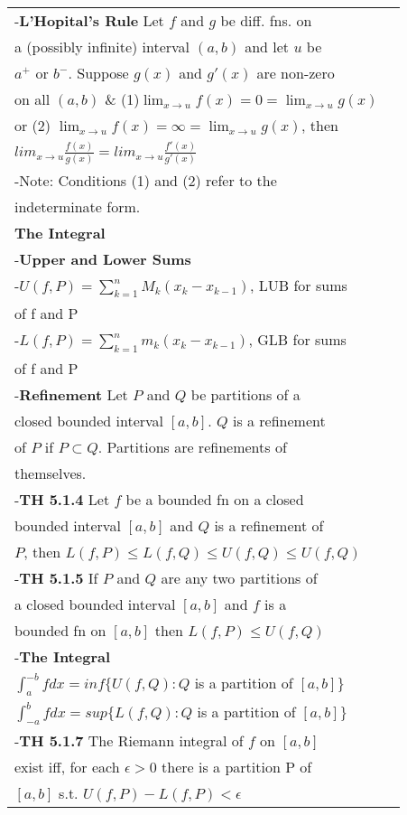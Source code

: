 \documentclass[10 pt,landscape]{article}
\begin{document}
\begin{multicols}{4}
\begin{tabular}{@{}ll@{}}
\end{tabular} 

\begin{tabular}{@{}ll@{}}


-\textbf{L'Hopital's Rule} Let $f$ and $g$ be diff. fns. on \\ a (possibly infinite) interval $(a,b)$ 
and let $u$ be \\
$a^{+}$ or $b^{-}$. Suppose $g(x)$ and $g'(x)$ are 
non-zero\\ on all $(a,b)$ \& (1)$ \lim_{x \to 
	u}f(x)=0=\lim_{x \to u}g(x)$ \\ or (2) $ \lim_{x \to u}f(x)=\infty=\lim_{x \to u}g(x)$, then\\ $lim_{x \to u}\frac{f(x)}{g(x)}=lim_{x \to u}\frac{f'(x)}{g'(x)}$\\
-Note: Conditions (1) and (2) refer to the\\ indeterminate form.
\\
\textbf{The Integral}\\
-\textbf{Upper and Lower Sums}\\
-$U(f,P)=\sum_{k=1}^{n}M_k(x_k-x_{k-1})$, LUB for sums\\of f and P\\
-$L(f,P)=\sum_{k=1}^{n}m_k(x_k-x_{k-1})$, GLB for sums\\of f and P\\
-\textbf{Refinement} Let $P$ and $Q$ be partitions of a \\closed bounded interval $[a,b]$. $Q$ is a refinement\\ of $P$ if $P \subset Q$. Partitions are refinements of\\ themselves.\\
-\textbf{TH 5.1.4} Let $f$ be a bounded fn on a closed\\ bounded interval $[a,b]$ and $Q$ is a refinement of \\$P$, then $L(f,P)\leq L(f,Q)\leq U(f,Q) \leq U(f,Q)$\\
-\textbf{TH 5.1.5} If $P$ and $Q$ are any two partitions of \\a closed bounded interval $[a,b]$ and $f$ is a \\bounded fn on $[a,b]$ then $L(f,P)\leq U(f,Q)$\\
-\textbf{The Integral}\\
$\int_{a}^{-b}f dx=inf\{U(f,Q): Q$ is a partition of $[a,b]\}$\\
$\int_{-a}^{b}f dx=sup\{L(f,Q): Q$ is a partition of $[a,b]\}$\\
-\textbf{TH 5.1.7} The Riemann integral of $f$ on $[a,b]$\\ exist iff, for each $\epsilon >0$ there is a partition P of \\ $[a,b]$ s.t. $U(f,P)-L(f,P)< \epsilon $\\

\end{tabular}
\end{multicols}
\end{document}

